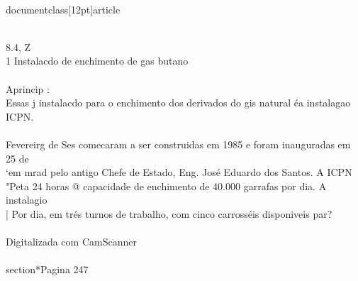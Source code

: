 \\documentclass[12pt]{article}
\begin{document}
\\
8.4, Z\\
1 Instalacdo de enchimento de gas butano\\
\\
Aprincip :\\
Essas j instalacdo para o enchimento dos derivados do gis natural éa instalagao ICPN.\\
\\
Fevereirg de Ses comecaram a ser construidas em 1985 e foram inauguradas em 25 de\\
‘em mrad pelo antigo Chefe de Estado, Eng. José Eduardo dos Santos. A ICPN\\
"Peta 24 horas @ capacidade de enchimento de 40.000 garrafas por dia. A instalagio\\
| Por dia, em trés turnos de trabalho, com cinco carrosséis disponiveis par?\\
\\
Digitalizada com CamScanner\\

\\section*{Pagina 247}
\end{document}
